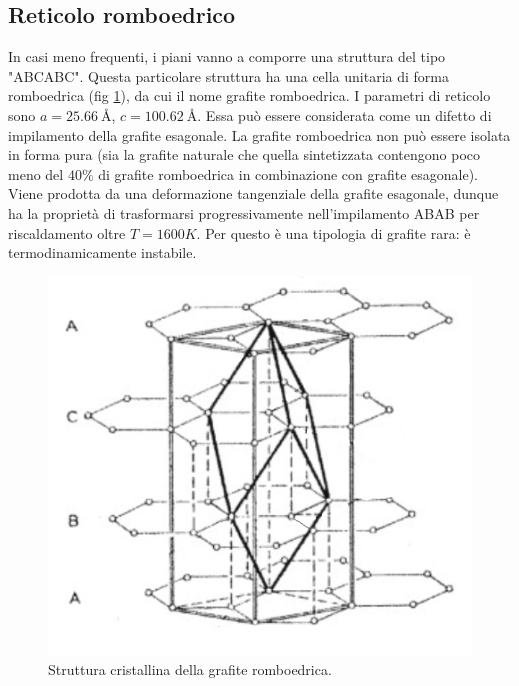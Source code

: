 \documentclass[a4paper,titlepage]{book}
\begin{document}
 \subsection{Reticolo romboedrico}
In casi meno frequenti, i piani vanno a comporre una struttura del tipo "ABCABC". Questa particolare struttura ha una cella unitaria di forma romboedrica (fig \ref{ABC}), da cui il nome grafite romboedrica. I parametri di reticolo sono $a= \SI{25.66}\angstrom$, $c = \SI{100.62}\angstrom$. 
Essa può essere considerata come un difetto di impilamento della grafite esagonale. La grafite romboedrica non può essere isolata in forma pura (sia la grafite naturale che quella sintetizzata contengono poco meno del $40\%$ di grafite romboedrica in combinazione con grafite esagonale). Viene prodotta da una deformazione tangenziale della grafite esagonale, dunque ha la proprietà di trasformarsi progressivamente nell'impilamento ABAB per riscaldamento oltre $T=1600 K$. Per questo è una tipologia di grafite rara: è termodinamicamente instabile. 
\begin{figure}[h!] 
	\centering
	\includegraphics[width=0.6\columnwidth]{ABCABC.png}
	\caption{ 	\label{ABC}
		Struttura cristallina della grafite romboedrica.
	}
\end{figure}
\end{document}
